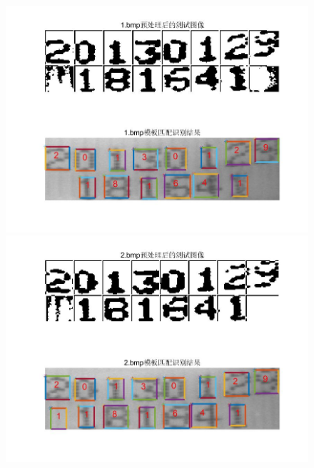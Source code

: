 \documentclass[cn]{elegantbook}
\begin{document}
\begin{figure}[!h]
	\centering
	\begin{minipage}[t]{0.48\textwidth}
		\centering
		\includegraphics[width=\textwidth]{save1}
	\end{minipage}
	\begin{minipage}[t]{0.48\textwidth}
		\centering
		\includegraphics[width=\textwidth]{save2}
	\end{minipage}
	\begin{minipage}[t]{0.48\textwidth}
		\centering

\end{minipage}
\end{figure}
\end{document}
